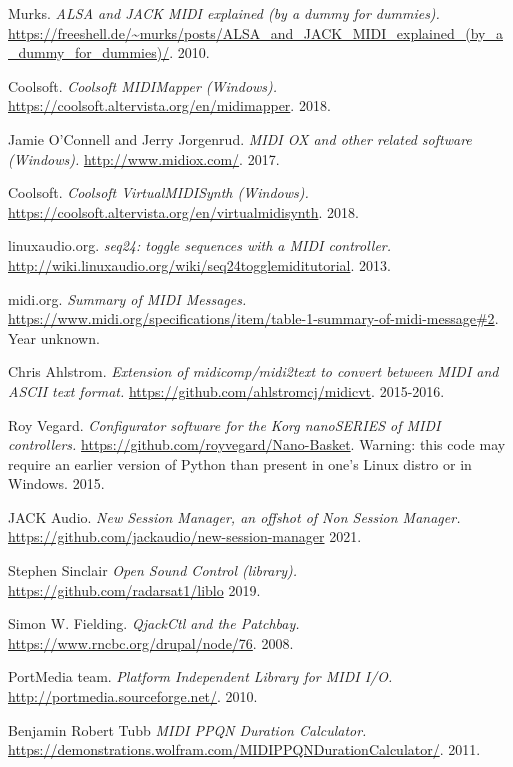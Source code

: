 {\begin{thebibliography}{99}
   Murks.
   \emph{ALSA and JACK MIDI explained (by a dummy for dummies).}
   \url{https://freeshell.de/~murks/posts/ALSA_and_JACK_MIDI_explained_(by_a_dummy_for_dummies)/}.
   2010.

   Coolsoft.
   \emph{Coolsoft MIDIMapper (Windows).}
   \url{https://coolsoft.altervista.org/en/midimapper}.
   2018.

   Jamie O'Connell and Jerry Jorgenrud.
   \emph{MIDI OX and other related software (Windows).}
   \url{http://www.midiox.com/}.
   2017.

   Coolsoft.
   \emph{Coolsoft VirtualMIDISynth (Windows).}
   \url{https://coolsoft.altervista.org/en/virtualmidisynth}.
   2018.

   linuxaudio.org.
   \emph{seq24: toggle sequences with a MIDI controller.}
   \url{http://wiki.linuxaudio.org/wiki/seq24togglemiditutorial}.
   2013.

   midi.org.
   \emph{Summary of MIDI Messages.}
   \url{https://www.midi.org/specifications/item/table-1-summary-of-midi-message#2}.
   Year unknown.

   Chris Ahlstrom.
   \emph{Extension of midicomp/midi2text to convert between MIDI and ASCII
      text format.}
   \url{https://github.com/ahlstromcj/midicvt}.
   2015-2016.

   Roy Vegard.
   \emph{Configurator software for the Korg nanoSERIES of MIDI controllers.}
   \url{https://github.com/royvegard/Nano-Basket}.
   Warning: this code may require an earlier version of Python than present in
   one's Linux distro or in Windows.
   2015.

   JACK Audio.
   \emph{New Session Manager, an offshot of Non Session Manager.}
   \url{https://github.com/jackaudio/new-session-manager}
   2021.

   Stephen Sinclair
   \emph{Open Sound Control (library).}
   \url{https://github.com/radarsat1/liblo}
   2019.

   Simon W. Fielding.
   \emph{QjackCtl and the Patchbay.}
   \url{https://www.rncbc.org/drupal/node/76}.
   2008.

   PortMedia team.
   \emph{Platform Independent Library for MIDI I/O.}
   \url{http://portmedia.sourceforge.net/}.
   2010.

   Benjamin Robert Tubb
   \emph{MIDI PPQN Duration Calculator.}
   \url{https://demonstrations.wolfram.com/MIDIPPQNDurationCalculator/}.
   2011.


\end{thebibliography}}
